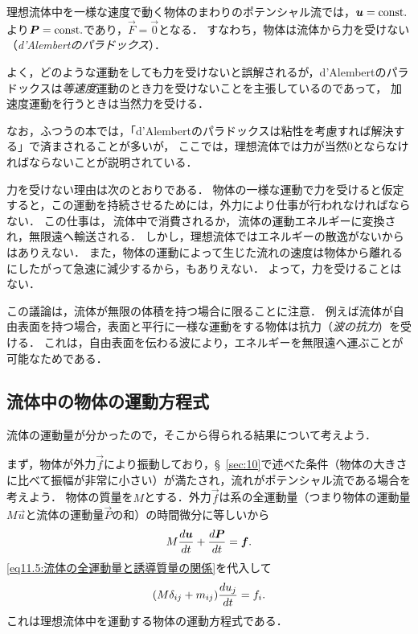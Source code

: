 理想流体中を一様な速度で動く物体のまわりのポテンシャル流では，$\vb*{u}=\mathrm{const.}$より$\vb*{P}=\mathrm{const.}$であり，$\vec{F}=\vec{0}$となる．
すなわち，物体は流体から力を受けない（\emph{d'Alembertのパラドックス}）．
\begin{details}
よく，どのような運動をしても力を受けないと誤解されるが，d'Alembertのパラドックスは\emph{等速度}運動のとき力を受けないことを主張しているのであって，
加速度運動を行うときは当然力を受ける．

なお，ふつうの本では，「d'Alembertのパラドックスは粘性を考慮すれば解決する」で済まされることが多いが，
ここでは，理想流体では力が当然0とならなければならないことが説明されている．
\end{details}
\noindent
力を受けない理由は次のとおりである．
物体の一様な運動で力を受けると仮定すると，この運動を持続させるためには，外力により仕事が行われなければならない．
この仕事は，\,流体中で消費されるか，\,流体の運動エネルギーに変換され，無限遠へ輸送される．
しかし，理想流体ではエネルギーの散逸がないからはありえない．
また，物体の運動によって生じた流れの速度は物体から離れるにしたがって急速に減少するから，もありえない．
よって，力を受けることはない．

\begin{details}
この議論は，流体が無限の体積を持つ場合に限ることに注意．
例えば流体が自由表面を持つ場合，表面と平行に一様な運動をする物体は抗力（\emph{波の抗力}）を受ける．
これは，自由表面を伝わる波により，エネルギーを無限遠へ運ぶことが可能なためである．
\end{details}





\subsection*{流体中の物体の運動方程式}

流体の運動量が分かったので，そこから得られる結果について考えよう．

まず，物体が外力$\vec{f}$により振動しており，\S~\ref{sec:10}で述べた条件（物体の大きさに比べて振幅が非常に小さい）が満たされ，流れがポテンシャル流である場合を考えよう．
物体の質量を$M$とする．外力$\vec{f}$は系の全運動量（つまり物体の運動量$M\vec{u}$と流体の運動量$\vec{P}$の和）の時間微分に等しいから
\[
    M \dv{\vb*{u}}{t} + \dv{\vb*{P}}{t} = \vb*{f} .
\]
\eqref{eq11.5:流体の全運動量と誘導質量の関係}を代入して
\begin{equation}\label{eq11.8:理想流体中を運動する物体の運動方程式}
    (M\delta_{ij} + m_{ij}) \dv{u_j}{t} = f_i .
\end{equation}
これは理想流体中を運動する物体の運動方程式である．




